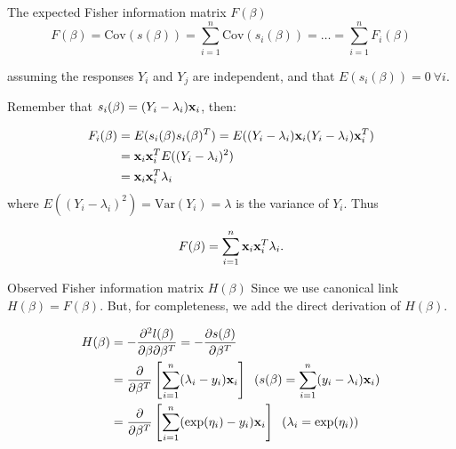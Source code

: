 \documentclass[
  ignorenonframetext,
]{beamer}
\begin{document}
\begin{frame}
\begin{block}{The expected Fisher information matrix \(F(\beta)\)}
\label{the-expected-fisher-information-matrix-fbeta}
\[
F(\beta) = \text{Cov}(s(\beta)) = \sum_{i=1}^n \text{Cov}(s_i(\beta)) = \dots = \sum_{i=1}^n F_i(\beta) 
\]

assuming the responses \(Y_i\) and \(Y_j\) are independent, and that
\(E(s_i(\beta)) = 0 \ \forall i\).

Remember that \(s_i(\beta)=(Y_i-\lambda_i){\bf x}_i\), then:

\[
\begin{aligned}
F_i(\beta) &= E(s_i(\beta)s_i(\beta)^T) = E((Y_i-\lambda_i){\bf x}_i(Y_i-\lambda_i){\bf x}_i^T)\\
&= {\bf x}_i{\bf x}_i^T E((Y_i-\lambda_i)^2) \\
&= {\bf x}_i{\bf x}_i^T \lambda_i
\end{aligned}
\] where \(E((Y_i-\lambda_i)^2)=\text{Var}(Y_i)=\lambda\) is the
variance of \(Y_i\). Thus

\[F(\beta) = \sum_{i=1}^n {\bf x}_i{\bf x}_i^T \lambda_i.\]
\end{block}
\end{frame}

\begin{frame}
\begin{block}{Observed Fisher information matrix \(H(\beta)\)}
\label{observed-fisher-information-matrix-hbeta}
Since we use canonical link \(H(\beta)=F(\beta)\). But, for
completeness, we add the direct derivation of \(H(\beta)\).

\[
\begin{aligned}
H(\beta) &= -\frac{\partial^2l(\beta)}{\partial\beta\partial\beta^T} = -\frac{\partial s(\beta)}{\partial\beta^T} \\
&= \frac{\partial}{\partial\beta^T}\left[\sum_{i=1}^n (\lambda_i-y_i){\bf x}_i \right] \;\; (s(\beta) = \sum_{i=1}^n (y_i-\lambda_i){\bf x}_i)\\
&=\frac{\partial}{\partial\beta^T}\left[\sum_{i=1}^n (\exp(\eta_i)-y_i){\bf x}_i \right] \;\; (\lambda_i = \exp(\eta_i))
\end{aligned}
\]
\end{block}
\end{frame}
\end{document}
